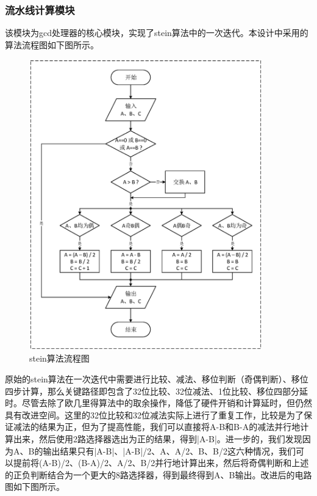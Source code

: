 \documentclass[12pt]{article}
\begin{document}
\subsubsection{流水线计算模块}
该模块为gcd处理器的核心模块，实现了stein算法中的一次迭代。本设计中采用的算法流程图如下图所示。

\begin{figure}[H]
\begin{center}
\includegraphics[width=0.9\textwidth]{./yhc_hp/work_flow.eps}
\caption{stein算法流程图}
\end{center}
\end{figure}

原始的stein算法在一次迭代中需要进行比较、减法、移位判断（奇偶判断）、移位四步计算，那么关键路径即包含了32位比较、32位减法、1位比较、移位四部分延时。尽管去除了欧几里得算法中的取余操作，降低了硬件开销和计算延时，但仍然具有改进空间。这里的32位比较和32位减法实际上进行了重复工作，比较是为了保证减法的结果为正，但为了提高性能，我们可以直接将A-B和B-A的减法并行地计算出来，然后使用2路选择器选出为正的结果，得到|A-B|。进一步的，我们发现因为A、B的输出结果只有|A-B|、|A-B|/2、A、A/2、B、B/2这六种情况，我们可以提前将(A-B)/2、(B-A)/2、A/2、B/2并行地计算出来，然后将奇偶判断和上述的正负判断结合为一个更大的8路选择器，得到最终得到A、B输出。改进后的电路图如下图所示。
\end{document}
